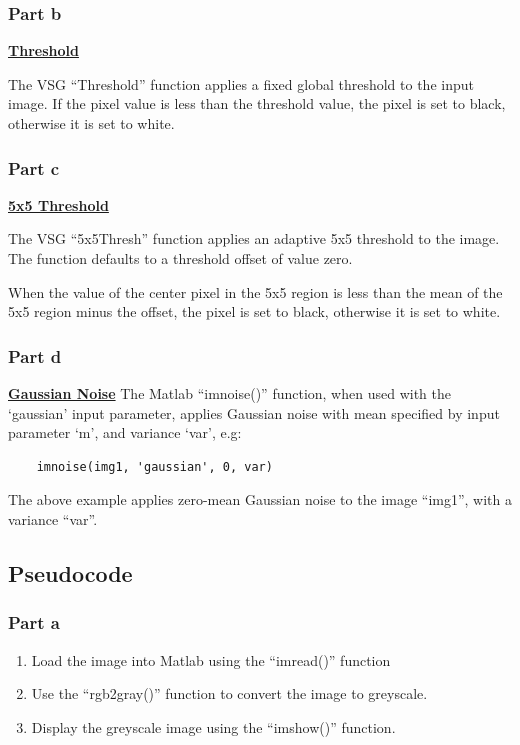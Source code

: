 \documentclass[a4paper]{article}
\begin{document}
	\subsubsection{Part b}
	\underline{\textbf{Threshold}}
	\par The VSG ``Threshold'' function applies a fixed global threshold to
	the input image. If the pixel value is less than the threshold value,
	the pixel is set to black, otherwise it is set to white.
	\subsubsection{Part c}
	\underline{\textbf{5x5 Threshold}}
	\par The VSG ``5x5Thresh'' function applies an adaptive 5x5 threshold
	to the image. The function defaults to a threshold offset of value zero.
	\par When the value of the center pixel in the 5x5 region is less than the
	mean of the 5x5 region minus the offset, the pixel is set to black,
	otherwise it is set to white.
	\subsubsection{Part d}
	\underline{\textbf{Gaussian Noise}}
	The Matlab ``imnoise()'' function, when used with the `gaussian' input
	parameter, applies Gaussian noise with mean specified by input
	parameter `m', and variance `var', e.g:
	\begin{lstlisting}
	imnoise(img1, 'gaussian', 0, var)
	\end{lstlisting}
	The above example applies zero-mean Gaussian noise to the image
	``img1'', with a variance ``var''.
	\subsection{Pseudocode}
	\subsubsection{Part a}
	\begin{enumerate}
		\item Load the image into Matlab using the ``imread()''
			function
		\item Use the ``rgb2gray()'' function to convert the image to
			greyscale.
		\item Display the greyscale image using the ``imshow()''
			function.
	\end{enumerate}
\end{document}
